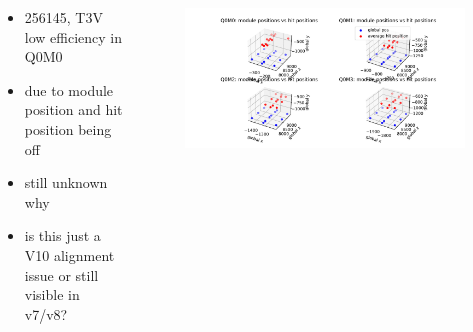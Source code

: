 \documentclass[aspectratio=1610, 12pt]{beamer}
\begin{document}
\begin{frame}
  \begin{columns}
    \begin{column}[c]{0.43\textwidth}
      \begin{itemize}
        \item 256145, T3V low efficiency in Q0M0
        \item due to module position and hit position being off
        \item still unknown why
        \item is this just a V10 alignment issue or still visible in v7/v8?
      \end{itemize}
    \end{column}
    \begin{column}[c]{0.55\textwidth}
      \begin{figure}
        \includegraphics[width=\textwidth]{plots/bad_module_Q0M0.pdf}
      \end{figure}
    \end{column}
  \end{columns}
\end{frame}
\end{document}
